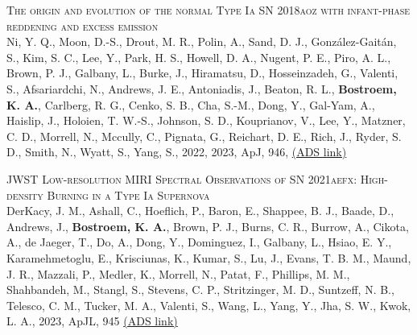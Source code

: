 \begin{revnumerate}[67]
        \item{\textsc{The origin and evolution of the normal Type Ia SN 2018aoz with infant-phase reddening and excess emission}\\ 
    Ni, Y. Q., Moon, D.-S., Drout, M. R., Polin, A., Sand, D. J., Gonz\'{a}lez-Gait\'{a}n, S., Kim, S. C., Lee, Y., Park, H. S., Howell, D. A., Nugent, P. E., Piro, A. L., Brown, P. J., Galbany, L., Burke, J., Hiramatsu, D., Hosseinzadeh, G., Valenti, S., Afsariardchi, N., Andrews, J. E., Antoniadis, J., Beaton, R. L., \textbf{Bostroem, K. A.}, Carlberg, R. G., Cenko, S. B., Cha, S.-M., Dong, Y., Gal-Yam, A., Haislip, J., Holoien, T. W.-S., Johnson, S. D., Kouprianov, V., Lee, Y., Matzner, C. D., Morrell, N., Mccully, C., Pignata, G., Reichart, D. E., Rich, J., Ryder, S. D., Smith, N., Wyatt, S., Yang, S., 2022, 2023, ApJ, 946, 
    \color{blue}\href{https://ui.adsabs.harvard.edu/abs/2023ApJ...946....7N}{(ADS link)}\color{black}}\\

    \item{\textsc{JWST Low-resolution MIRI Spectral Observations of SN 2021aefx: High-density Burning in a Type Ia Supernova}\\ 
    DerKacy, J. M., Ashall, C., Hoeflich, P., Baron, E., Shappee, B. J., Baade, D., Andrews, J., \textbf{Bostroem, K. A.}, Brown, P. J., Burns, C. R., Burrow, A., Cikota, A., de Jaeger, T., Do, A., Dong, Y., Dominguez, I., Galbany, L., Hsiao, E. Y., Karamehmetoglu, E., Krisciunas, K., Kumar, S., Lu, J., Evans, T. B. M., Maund, J. R., Mazzali, P., Medler, K., Morrell, N., Patat, F., Phillips, M. M., Shahbandeh, M., Stangl, S., Stevens, C. P., Stritzinger, M. D., Suntzeff, N. B., Telesco, C. M., Tucker, M. A., Valenti, S., Wang, L., Yang, Y., Jha, S. W., Kwok, L. A., 2023, ApJL, 945 
    \color{blue}\href{https://ui.adsabs.harvard.edu/abs/2023ApJ...945L...2D}{(ADS link)}\color{black}}\\


\end{revnumerate}
